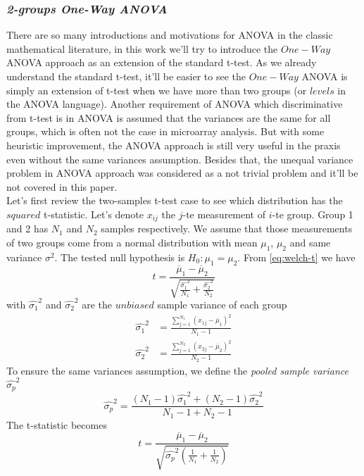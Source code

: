 \subsubsection{\it 2-groups One-Way ANOVA}
There are so many introductions and motivations for ANOVA in the classic mathematical literature, in this work we'll try to introduce the $One-Way$ ANOVA approach as an extension of the standard t-test. As we already understand the standard t-test, it'll be easier to see the $One-Way$ ANOVA is simply an extension of t-test when we have more than two groups (or $levels$ in the ANOVA language). Another requirement of ANOVA which discriminative from t-test is in ANOVA is assumed that the variances are the same for all groups, which is often not the case in microarray analysis. But with some heuristic improvement, the ANOVA approach is still very useful in the praxis even without the same variances assumption. Besides that, the unequal variance problem in ANOVA approach was considered as a not trivial problem and it'll be not covered in this paper.\\
Let's first review the two-samples t-test case to see which distribution has the $squared$ t-statistic. Let's denote 
$x_{ij}$ the $j$-te measurement of $i$-te group. Group 1 and 2 has $N_1$ and $N_2$ samples respectively. We assume that those measurements of two groups come from a normal distribution with mean $\mu_1$, $\mu_2$  and same variance $\sigma^2$. The tested null hypothesis is $H_0: \mu_1 = \mu_2$. From \autoref{eq:welch-t} we have
\begin{equation} 
	t = \frac{\overline \mu_1 - \overline \mu_2}{ \sqrt{ \frac{\hat{\sigma_1}^2}{N_1} + \frac{\hat{\sigma_2}^2}{N_2} } } 
\end{equation} 
with $\hat{\sigma_1}^2$ and $\hat{\sigma_2}^2$ are the $unbiased$ sample variance of each group
\begin{align*}
	\hat{\sigma_1}^2 & = \frac{\sum_{j=1}^{N_1} (x_{1j} - \overline \mu_1)^2}{{N_1-1}} \\
	\hat{\sigma_2}^2 & = \frac{\sum_{j=1}^{N_2} (x_{2j} - \overline \mu_2)^2}{{N_2-1}}	
\end{align*}
To ensure the same variances assumption, we define the {\it pooled sample variance} $\hat{\sigma_p}^2$
\begin{equation} 
	\hat{\sigma_p}^2 = \frac{(N_1 - 1)\hat{\sigma_1}^2 + (N_2 - 1)\hat{\sigma_2}^2}{N_1 - 1 + N_2 - 1}
\end{equation} 
The t-statistic becomes
\begin{equation} 
	t = \frac{\overline \mu_1 - \overline \mu_2}{ \sqrt{\hat{\sigma_p}^2 \left(\frac{1}{N_1} + \frac{1}{N_2}\right) } } 
\end{equation} 
